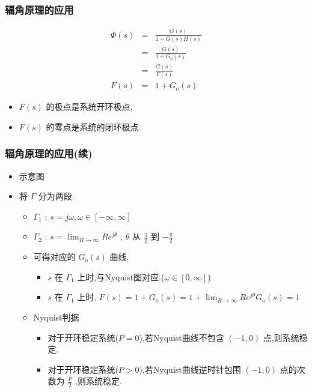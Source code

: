 \documentclass[table]{article}
\begin{document}
\begin{frame}
\frametitle{辐角原理的应用}
\label{sec-4-1-3}

\begin{eqnarray*}
\Phi(s) &= &\frac{G(s)}{1+G(s)H(s)} \\
       &=&\frac{G(s)}{1+G_o(s)} \\
       &=&\frac{G(s)}{F(s)} \\
 F(s)&=&1+G_o(s)
\end{eqnarray*}
\begin{itemize}
\item $F(s)$  的极点是系统开环极点,
\item $F(s)$  的零点是系统的闭环极点.
\end{itemize}
\end{frame}
\begin{frame}
\frametitle{辐角原理的应用(续)}
\label{sec-4-1-4}
\begin{itemize}

\item 示意图
\label{sec-4-1-4-1}%


\item 将 $\Gamma$ 分为两段:
\label{sec-4-1-4-2}%
\begin{itemize}
\item $\Gamma_1$ : $s=j\omega,\omega\in[-\infty,\infty]$
\item $\Gamma_2$ : $s=\lim_{R\rightarrow\infty}Re^{j\theta}$ , $\theta$ 从 $\frac{\pi}{2}$ 到 $-\frac{\pi}{2}$
\item 可得对应的 $G_o(s)$ 曲线.
\begin{itemize}
\item $s$ 在 $\Gamma_1$ 上时,与Nyquist图对应.($\omega\in[0,\infty]$)
\item $s$ 在 $\Gamma_1$ 上时, $F(s)=1+G_o(s)=1+\lim_{R\rightarrow\infty}Re^{j\theta}G_o(s)=1$
\end{itemize}
\item <3-> Nyquist判据
\begin{itemize}
\item 对于开环稳定系统($P=0$),若Nyquist曲线不包含 $(-1,0)$ 点,则系统稳定.
\item 对于开环稳定系统($P>0$),若Nyquist曲线逆时针包围 $(-1,0)$ 点的次数为 $\frac{P}{2}$ ,则系统稳定.
\end{itemize}
\end{itemize}

\end{itemize} %
\end{frame}
\end{document}
